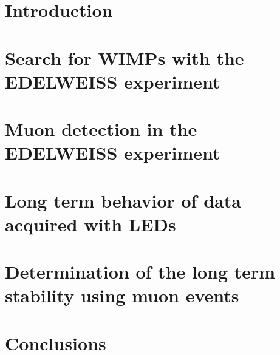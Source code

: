 \documentclass{include/thesisclass}
\begin{document}
    \FrontMatter

    
    

    \begingroup \let\clearpage\relax    %
    \tableofcontents                    %
    \endgroup
    \cleardoublepage



    \MainMatter

    \chapter{Introduction}
    \label{chap:intro}
    
    \chapter{Search for WIMPs with the EDELWEISS experiment}
    \label{chap:theo}
    
    \chapter{Muon detection in the EDELWEISS experiment}
    \label{chap:muon}
    
    \chapter{Long term behavior of data acquired with LEDs}
    \label{chap:ana_led}
    
    \chapter{Determination of the long term stability using muon events }
    \label{chap:ana_muon}
    
    \chapter{Conclusions}
    \label{conclusion}
    





    \Appendix
    \chapter*{\appendixname} 
\end{document}
